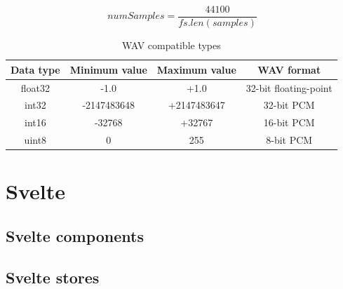 \begin{equation}
    \label{formula:sampling}
    numSamples = \frac{44100}{fs.len(samples)}
\end{equation}


\begin{table}[]
    \centering
    \begin{tabular}{|c|c|c|c|}
    \hline
    \textbf{Data type} & \textbf{Minimum value} & \textbf{Maximum value} & \textbf{WAV format} \\
    \hline
    float32 & -1.0 & +1.0 & 32-bit floating-point \\ \hline
    int32 & -2147483648 & +2147483647 & 32-bit PCM \\ \hline
    int16 & -32768 & +32767 & 16-bit PCM \\ \hline
    uint8 & 0 & 255 & 8-bit PCM \\
    \hline
    \end{tabular}
    \caption{WAV compatible types}
    \label{tab:my_label}
\end{table}





\section{Svelte}\label{txt.implementation.svelte}
\subsection{Svelte components}\label{txt.implementation.components}
\subsection{Svelte stores}\label{txt.implementation.stores}


